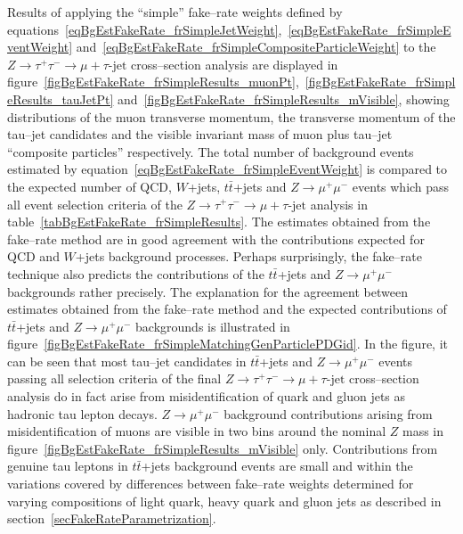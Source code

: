 Results of applying the ``simple'' fake--rate weights defined by 
equations~\ref{eqBgEstFakeRate_frSimpleJetWeight},~\ref{eqBgEstFakeRate_frSimpleEventWeight} 
and~\ref{eqBgEstFakeRate_frSimpleCompositeParticleWeight}
to the $Z \rightarrow \tau^{+} \tau^{-} \rightarrow \mu + \tau\mbox{-jet}$ cross--section analysis
are displayed in figure~\ref{figBgEstFakeRate_frSimpleResults_muonPt},~\ref{figBgEstFakeRate_frSimpleResults_tauJetPt} 
and~\ref{figBgEstFakeRate_frSimpleResults_mVisible},
showing distributions of the muon transverse momentum,
the transverse momentum of the tau--jet candidates and the visible invariant mass of muon plus tau--jet ``composite particles''
respectively.
The total number of background events estimated by equation~\ref{eqBgEstFakeRate_frSimpleEventWeight} 
is compared to the expected number of QCD, $W$+jets, $t\bar{t}$+jets and $Z \rightarrow \mu^{+} \mu^{-}$ events
which pass all event selection criteria of the $Z \rightarrow \tau^{+} \tau^{-} \rightarrow \mu + \tau\mbox{-jet}$ analysis
in table~\ref{tabBgEstFakeRate_frSimpleResults}.
The estimates obtained from the fake--rate method are in good agreement with the contributions
expected for QCD and $W$+jets background processes.
Perhaps surprisingly, the fake--rate technique also predicts the contributions of the
$t\bar{t}$+jets and $Z \rightarrow \mu^{+} \mu^{-}$ backgrounds rather precisely. 
The explanation for the agreement between estimates obtained from the fake--rate method and the expected contributions
of $t\bar{t}$+jets and $Z \rightarrow \mu^{+} \mu^{-}$ backgrounds
is illustrated in figure~\ref{figBgEstFakeRate_frSimpleMatchingGenParticlePDGid}.
In the figure, it can be seen that most tau--jet candidates in 
$t\bar{t}$+jets and $Z \rightarrow \mu^{+} \mu^{-}$ events passing all selection criteria of the final
$Z \rightarrow \tau^{+} \tau^{-} \rightarrow \mu + \tau\mbox{-jet}$ cross--section analysis
do in fact arise from misidentification of quark and gluon jets as hadronic tau lepton decays.
$Z \rightarrow \mu^{+} \mu^{-}$ background contributions arising from misidentification of muons
are visible in two bins around the nominal $Z$ mass in figure~\ref{figBgEstFakeRate_frSimpleResults_mVisible} only.
Contributions from genuine tau leptons in $t\bar{t}$+jets background events are small 
and within the variations covered by differences between fake--rate weights determined for 
varying compositions of light quark, heavy quark and gluon jets as described in section~\ref{secFakeRateParametrization}.

